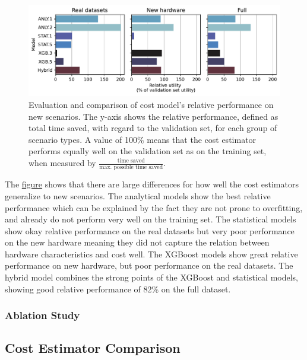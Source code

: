 \begin{figure}
  \centering
  \includegraphics[width=\linewidth]{chapters/06_evaluation/figures/eval_generalization.pdf}
  \caption{Evaluation and comparison of cost model's relative performance on new scenarios. The y-axis shows the relative performance, defined as total time saved, with regard to the validation set, for each group of scenario types. A value of 100\% means that the cost estimator performs equally well on the validation set as on the training set, when measured by $\frac{\text{time saved}}{\text{max. possible time saved}}$.}
  \label{fig:6-generalization}
\end{figure}

The \hyperref[fig:6-generalization]{figure} shows that there are large differences for how well the cost estimators generalize to new scenarios. The analytical models show the best relative performance which can be explained by the fact they are not prone to overfitting, and already do not perform very well on the training set. The statistical models show okay relative performance on the real datasets but very poor performance on the new hardware meaning they did not capture the relation between hardware characteristics and cost well. The XGBoost models show great relative performance on new hardware, but poor performance on the real datasets. The hybrid model combines the strong points of the XGBoost and statistical models, showing good relative performance of 82\% on the full dataset.

\subsubsection{Ablation Study}
\label{subsubsec:6-ablation}

\subsection{Cost Estimator Comparison}
\label{subsec:6-sota-comparison}

